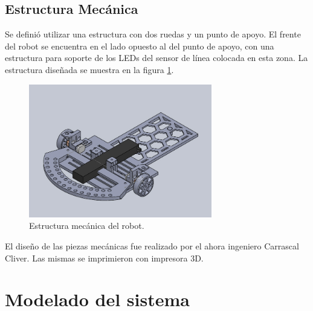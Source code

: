 \documentclass[10pt,conference,a4paper,onecolumn]{article}%
\begin{document}
\subsection{Estructura Mecánica}%
Se definió utilizar una estructura con dos ruedas y un punto de apoyo. El frente del robot se encuentra en el lado opuesto al del punto de apoyo, con una estructura para soporte de los LEDs del sensor de línea colocada en esta zona. La estructura diseñada se muestra en la figura \ref{fig:estructuraRobot}.
\begin{figure}[h] %
\centering
\includegraphics[width=8cm]{./imagenes/estructuraCompleta.png}
\caption{Estructura mecánica del robot.}
\label{fig:estructuraRobot}
\end{figure}
El diseño de las piezas mecánicas fue realizado por el ahora ingeniero Carrascal Cliver. Las mismas se imprimieron con impresora 3D.
\section{Modelado del sistema} \label{sec:Modelado_del_sistema}
 
\end{document}
